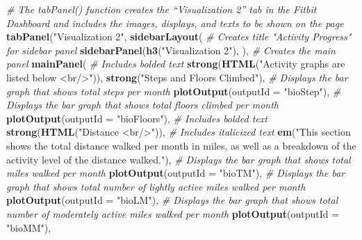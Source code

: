 \documentclass[]{book}
\newenvironment{Shaded}{\begin{snugshade}}{\end{snugshade}}
\newcommand{\CommentTok}[1]{\textcolor[rgb]{0.56,0.35,0.01}{\textit{#1}}}
\newcommand{\DataTypeTok}[1]{\textcolor[rgb]{0.13,0.29,0.53}{#1}}
\newcommand{\KeywordTok}[1]{\textcolor[rgb]{0.13,0.29,0.53}{\textbf{#1}}}
\newcommand{\NormalTok}[1]{#1}
\newcommand{\StringTok}[1]{\textcolor[rgb]{0.31,0.60,0.02}{#1}}
\begin{document}
\begin{Shaded}
\begin{Highlighting}[]
{{             \CommentTok{# The tabPanel() function creates the “Visualization 2” tab in the Fitbit Dashboard and includes the images, displays, and texts to be shown on the page}
             \KeywordTok{tabPanel}\NormalTok{(}\StringTok{"Visualization 2"}\NormalTok{,}
                      \KeywordTok{sidebarLayout}\NormalTok{(}
                        \CommentTok{# Creates title "Activity Progress" for sidebar panel}
                        \KeywordTok{sidebarPanel}\NormalTok{(}\KeywordTok{h3}\NormalTok{(}\StringTok{"Visualization 2"}\NormalTok{),}
\NormalTok{                        ),}
                        \CommentTok{# Creates the main panel}
                        \KeywordTok{mainPanel}\NormalTok{(}
                          \CommentTok{# Includes bolded text}
                          \KeywordTok{strong}\NormalTok{(}\KeywordTok{HTML}\NormalTok{(}\StringTok{"Activity graphs are listed below <br/>"}\NormalTok{)),}
                          \KeywordTok{strong}\NormalTok{(}\StringTok{"Steps and Floors Climbed"}\NormalTok{),}
                          \CommentTok{# Displays the bar graph that shows total steps per month}
                          \KeywordTok{plotOutput}\NormalTok{(}\DataTypeTok{outputId =} \StringTok{"bioStep"}\NormalTok{),}
                          \CommentTok{# Displays the bar graph that shows total floors climbed per month}
                          \KeywordTok{plotOutput}\NormalTok{(}\DataTypeTok{outputId =} \StringTok{"bioFloors"}\NormalTok{),}
                          \CommentTok{# Includes bolded text}
                          \KeywordTok{strong}\NormalTok{(}\KeywordTok{HTML}\NormalTok{(}\StringTok{"Distance <br/>"}\NormalTok{)),}
                          \CommentTok{# Includes italicized text}
                          \KeywordTok{em}\NormalTok{(}\StringTok{"This section shows the total distance walked per month in miles, as well as a breakdown of the activity level of the distance walked."}\NormalTok{),}
                          \CommentTok{# Displays the bar graph that shows total miles walked per month}
                          \KeywordTok{plotOutput}\NormalTok{(}\DataTypeTok{outputId =} \StringTok{"bioTM"}\NormalTok{),}
                          \CommentTok{# Displays the bar graph that shows total number of lightly active miles walked per month}
                          \KeywordTok{plotOutput}\NormalTok{(}\DataTypeTok{outputId =} \StringTok{"bioLM"}\NormalTok{),}
                          \CommentTok{# Displays the bar graph that shows total number of moderately active miles walked per month}
                          \KeywordTok{plotOutput}\NormalTok{(}\DataTypeTok{outputId =} \StringTok{"bioMM"}\NormalTok{),}
}}
\end{Highlighting}
\end{Shaded}
\end{document}
